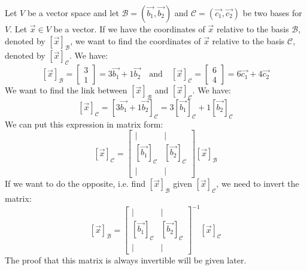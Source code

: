 \begin{eg}
    Let $V$ be a vector space and let $\mathcal{B} = (\vec{b_1}, \vec{b_2})$ and $\mathcal{C} = (\vec{c_1}, \vec{c_2})$ be two bases for $V$. Let $\vec{x} \in V$ be a vector. If we have the coordinates of $\vec{x}$ relative to the basis $\mathcal{B}$, denoted by $[\vec{x}]_{\mathcal{B}}$, we want to find the coordinates of $\vec{x}$ relative to the basis $\mathcal{C}$, denoted by $[\vec{x}]_{\mathcal{C}}$. We have:
    \[
        [\vec{x}]_\mathcal{B} = \begin{bmatrix}
            3 \\ 1
        \end{bmatrix} = 3\vec{b_1} + 1\vec{b_2} \quad \text{and} \quad [\vec{x}]_\mathcal{C} = \begin{bmatrix}
            6 \\ 4
        \end{bmatrix} = 6\vec{c_1} + 4\vec{c_2}
    \]
    We want to find the link between $[\vec{x}]_\mathcal{B}$ and $[\vec{x}]_\mathcal{C}$. We have:
    \[
        [\vec{x}]_\mathcal{C} = [3\vec{b_1} + 1\vec{b_2}]_\mathcal{C} = 3[\vec{b_1}]_\mathcal{C} + 1[\vec{b_2}]_\mathcal{C}
    \]
    We can put this expression in matrix form:
    \[
        [\vec{x}]_\mathcal{C} = \begin{bmatrix}
            | & | \\
            [\vec{b_1}]_\mathcal{C} & [\vec{b_2}]_\mathcal{C} \\
            | & |
        \end{bmatrix} [\vec{x}]_\mathcal{B}
    \]
    If we want to do the opposite, i.e. find $[\vec{x}]_\mathcal{B}$ given $[\vec{x}]_\mathcal{C}$, we need to invert the matrix:
    \[
        [\vec{x}]_\mathcal{B} = \begin{bmatrix}
            | & | \\
            [\vec{b_1}]_\mathcal{C} & [\vec{b_2}]_\mathcal{C} \\
            | & |
        \end{bmatrix}^{-1} [\vec{x}]_\mathcal{C}
    \]
    The proof that this matrix is always invertible will be given later.
\end{eg}

